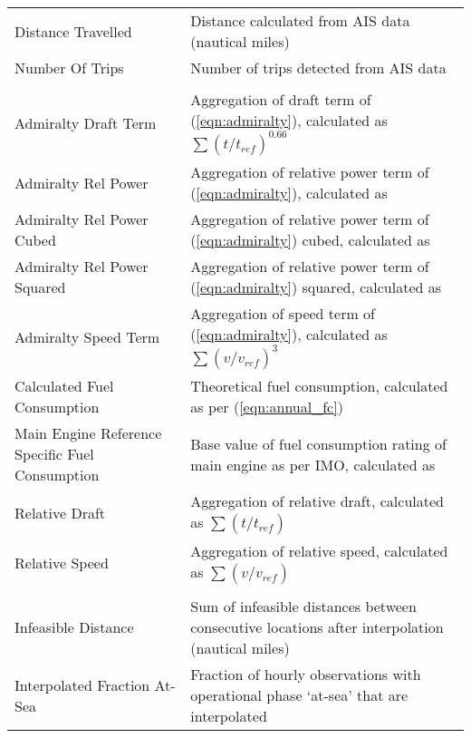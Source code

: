 \begin{tabular}[t]{>{\raggedright\arraybackslash}p{16em}>{\raggedright\arraybackslash}p{30em}}
\hspace{1em}Distance Travelled & Distance calculated from AIS data (nautical miles)\\
\hspace{1em}Number Of Trips & Number of trips detected from AIS data\\
\addlinespace[0.3em]
\multicolumn{2}{l}{\textbf{Calculated}}\\
\hspace{1em}Admiralty Draft Term & Aggregation of draft term of (\ref{eqn:admiralty}), calculated as $\sum (t/t_{\textit{ref}})^{0.66}$\\
\hspace{1em}Admiralty Rel Power & Aggregation of relative power term of (\ref{eqn:admiralty}), calculated as\\
\hspace{1em}Admiralty Rel Power Cubed & Aggregation of relative power term of (\ref{eqn:admiralty}) cubed, calculated as\\
\hspace{1em}Admiralty Rel Power Squared & Aggregation of relative power term of (\ref{eqn:admiralty}) squared, calculated as\\
\hspace{1em}Admiralty Speed Term & Aggregation of speed term of (\ref{eqn:admiralty}), calculated as $\sum (v/v_{\textit{ref}})^{3}$\\
\hspace{1em}Calculated Fuel Consumption & Theoretical fuel consumption, calculated as per (\ref{eqn:annual_fc})\\
\hspace{1em}Main Engine Reference Specific Fuel Consumption & Base value of fuel consumption rating of main engine as per IMO, calculated as\\
\hspace{1em}Relative Draft & Aggregation of relative draft, calculated as $\sum (t/t_{\textit{ref}})$\\
\hspace{1em}Relative Speed & Aggregation of relative speed, calculated as $\sum (v/v_{\textit{ref}})$\\
\addlinespace[0.3em]
\multicolumn{2}{l}{\textbf{Data Quality}}\\
\hspace{1em}Infeasible Distance & Sum of infeasible distances between consecutive locations after interpolation (nautical miles)\\
\hspace{1em}Interpolated Fraction At-Sea & Fraction of hourly observations with operational phase ‘at-sea’ that are interpolated\\
\bottomrule
\end{tabular}
